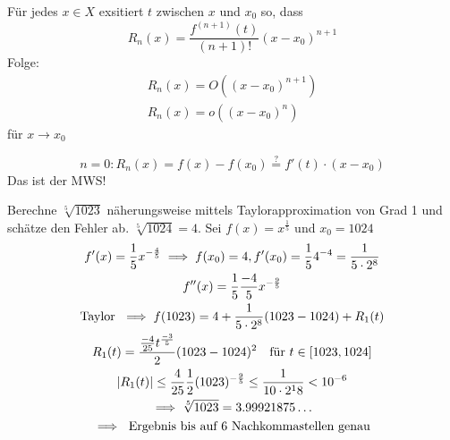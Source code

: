 \begin{satz*}[note = (Taylor)]
	Für jedes $x \in X$ exsitiert $t$ zwischen $x$ und $x_0$ so, dass
	\[ R_n(x) = \frac{f^{(n+1)}(t)}{(n+1)!} (x-x_0)^{n+1} \]
	Folge:
	\begin{gather*}
		R_n(x) = O((x-x_0)^{n+1}) \\
		R_n(x) = o((x-x_0)^n)
	\end{gather*}
	für $x \rightarrow x_0$
	
	\[ n=0 : R_n(x) = f(x) - f(x_0) \overset{?}{=} f'(t) \cdot (x-x_0) \]
	Das ist der MWS! \\
\end{satz*}
\begin{bsp}
	Berechne $\sqrt[5]{1023}$ näherungsweise mittels Taylorapproximation von Grad 1 und schätze den Fehler ab.
	$\sqrt[5]{1024} = 4$. Sei $f(x) = x^{\frac{1}{5}}$ und $x_0 = 1024$
	\begin{gather*}
		f'(x) = \frac{1}{5} x^{-\frac{4}{5}} \implies f(x_0) = 4, f'(x_0) = \frac{1}{5} 4^{-4} = \frac{1}{5 \cdot 2^8} \\
		f''(x) = \frac{1}{5} \frac{-4}{5} x^{-\frac{9}{5}} \\
		\text{Taylor } \implies f(1023) = 4 + \frac{1}{5 \cdot 2^8} (1023 - 1024) + R_1(t) \\
		R_1(t) = \frac{\frac{-4}{25} t^{\frac{-3}{5}}}{2} (1023 - 1024)^2 \quad \text{für } t \in [1023,1024] \\
		\abs{R_1(t)} \leq \frac{4}{25} \frac{1}{2} (1023)^{-\frac{9}{5}} \leq \frac{1}{10 \cdot 2^18} < 10^{-6} \\
		\implies \sqrt[5]{1023} = 3.99921875\dots \\
		\implies \text{ Ergebnis bis auf 6 Nachkommastellen genau}
	\end{gather*}
\end{bsp}
